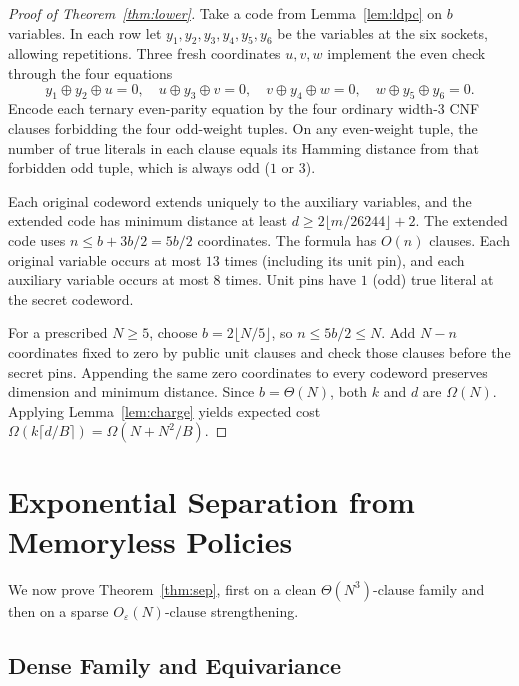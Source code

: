 \documentclass[11pt,a4paper]{article}
\theoremstyle{definition}
\theoremstyle{remark}
\newcommand{\xor}{\oplus}
\begin{document}
\begin{proof}[Proof of Theorem~\ref{thm:lower}]
Take a code from Lemma~\ref{lem:ldpc} on $b$ variables. In each row let $y_1,y_2,y_3,y_4,y_5,y_6$ be the variables at the six sockets, allowing repetitions. Three fresh coordinates $u,v,w$ implement the even check through the four equations
\[
    y_1 \xor y_2 \xor u = 0,\quad u \xor y_3 \xor v = 0,\quad v \xor y_4 \xor w = 0,\quad w \xor y_5 \xor y_6 = 0.
\]
Encode each ternary even-parity equation by the four ordinary width-$3$ CNF clauses forbidding the four odd-weight tuples. On any even-weight tuple, the number of true literals in each clause equals its Hamming distance from that forbidden odd tuple, which is always odd ($1$ or $3$).

Each original codeword extends uniquely to the auxiliary variables, and the extended code has minimum distance at least $d \ge 2\lfloor m/26244\rfloor + 2$. The extended code uses $n\le b+3b/2=5b/2$ coordinates. The formula has $O(n)$ clauses. Each original variable occurs at most $13$ times (including its unit pin), and each auxiliary variable occurs at most $8$ times. Unit pins have $1$ (odd) true literal at the secret codeword.

For a prescribed $N \ge 5$, choose $b=2\lfloor N/5\rfloor$, so $n\le 5b/2\le N$. Add $N-n$ coordinates fixed to zero by public unit clauses and check those clauses before the secret pins. Appending the same zero coordinates to every codeword preserves dimension and minimum distance. Since $b=\Theta(N)$, both $k$ and $d$ are $\Omega(N)$. Applying Lemma~\ref{lem:charge} yields expected cost $\Omega(k \lceil d/B \rceil) = \Omega(N + N^2/B)$.
\end{proof}

\section{Exponential Separation from Memoryless Policies}\label{sec:sep}

We now prove Theorem~\ref{thm:sep}, first on a clean $\Theta(N^3)$-clause family and then on a sparse $O_\varepsilon(N)$-clause strengthening.

\subsection{Dense Family and Equivariance}
\end{document}
